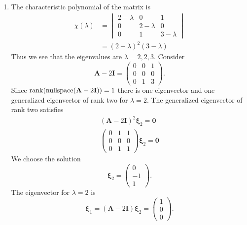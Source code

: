 {%
\begin{Solution}
  \label{solution dxdt=Ax}
  \begin{enumerate}
  \item
    The characteristic polynomial of the matrix is
    \begin{align*}
      \chi(\lambda)
      &= \begin{vmatrix}
        2 - \lambda  & 0             & 1 \\
        0               & 2 - \lambda        & 0 \\
        0               & 1             & 3 - \lambda
      \end{vmatrix} \\
      &= (2-\lambda)^2(3-\lambda)
    \end{align*}
    Thus we see that the eigenvalues are $\lambda = 2, 2, 3$.  
    Consider
    \[
    \mathbf{A} - 2 \mathbf{I} = 
    \begin{pmatrix}
      0 & 0 & 1 \\
      0 & 0 & 0 \\
      0 & 1 & 3
    \end{pmatrix}.
    \]
    Since $\mathop{\mathrm{rank}}\nolimits(\mathop{\mathrm{nullspace}}\nolimits(\mathbf{A} - 2 \mathbf{I})) = 1$ there is one eigenvector and one
    generalized eigenvector of rank two for $\lambda = 2$.  The generalized
    eigenvector of rank two satisfies
    \begin{gather*}
      (\mathbf{A} - 2 \mathbf{I})^2 \boldsymbol{\xi}_2 = \mathbf{0} \\
      \begin{pmatrix}
        0 & 1 & 1 \\
        0 & 0 & 0 \\
        0 & 1 & 1
      \end{pmatrix} \boldsymbol{\xi}_2 = \mathbf{0} 
    \end{gather*}
    We choose the solution
    \[
    \boldsymbol{\xi}_2 = \begin{pmatrix} 0 \\ -1 \\ 1 \end{pmatrix}.
    \]
    The eigenvector for $\lambda = 2$ is
    \[
    \boldsymbol{\xi}_1 = (\mathbf{A} - 2 \mathbf{I}) \boldsymbol{\xi}_2 = \begin{pmatrix} 1 \\ 0 \\ 0 \end{pmatrix}.
\]
\end{enumerate}
\end{Solution}}
